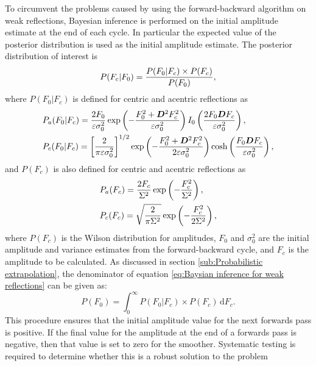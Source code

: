 To circumvent the problems caused by using the forward-backward algorithm on weak reflections, Bayesian inference is performed on the initial amplitude estimate at the end of each cycle.
In particular the expected value of the posterior distribution is used as the initial amplitude estimate.
The posterior distribution of interest is
\begin{equation}
	P(F_c | F_0) = \frac{P(F_0 | F_c) \times P(F_c)}{P(F_0)},
	\label{eq:Baysian inference for weak reflections}
\end{equation}
where $P(F_0 | F_c)$ is defined for centric and acentric reflections as
\begin{align}
    &P_a(F_0 | F_c) = \frac{2F_0}{\varepsilon \sigma_{0}^2} \exp \left(-\frac{F_0^2 + \boldsymbol{D}^2F_c^2}{\varepsilon \sigma_{0}^2}\right)I_0 \left(\frac{2F_0\boldsymbol{D}F_c}{\varepsilon \sigma_{0}^2}\right), \label{eq:Weak reflection likelihood function - acentric reflections} \\
    &P_c(F_0 | F_c) = \left[\frac{2}{\pi \varepsilon \sigma_{0}^2}\right]^{1/2} \exp \left(-\frac{F_0^2 + \boldsymbol{D}^2F_c^2}{2\varepsilon \sigma_{0}^2}\right) \cosh \left(\frac{F_0\boldsymbol{D}F_c}{\varepsilon \sigma_{0}^2}\right), \label{eq:Weak reflection likelihood function - centric reflections}
\end{align}
and $P(F_c)$ is also defined for centric and acentric reflections as
\begin{align}
    &P_a(F_c) = \frac{2F_c}{\Sigma^2} \exp \left(-\frac{F_c^2}{\Sigma^2}\right), \label{eq:Weak reflection prior distribution - acentric reflections} \\
    &P_c(F_c) = \sqrt{\frac{2}{\pi \Sigma^2}} \exp \left(-\frac{F_c^2}{2\Sigma^2}\right), \label{eq:Weak reflection prior distribution - centric reflections}
\end{align}
where $P(F_c)$ is the Wilson distribution for amplitudes, $F_0$ and $\sigma_{0}^2$ are the initial amplitude and variance estimates from the forward-backward cycle, and $F_c$ is the amplitude to be calculated.
As discussed in section \ref{sub:Probabilistic extrapolation}, the denominator of equation \ref{eq:Baysian inference for weak reflections} can be given as:
\begin{equation}
	P(F_0) = \int_0^{\infty} P(F_0 | F_c) \times P(F_c)\, \mathrm{d}F_c.
\end{equation}
This procedure ensures that the initial amplitude value for the next forwards pass is positive.
If the final value for the amplitude at the end of a forwards pass is negative, then that value is set to zero for the smoother.
Systematic testing is required to determine whether this is a robust solution to the problem
